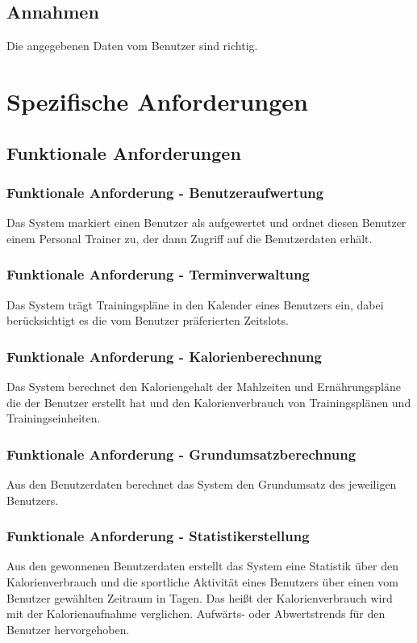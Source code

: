 \documentclass[12pt,a4paper,onecolumn]{article}
\begin{document}
\subsection{Annahmen}
Die angegebenen Daten vom Benutzer sind richtig.

\section{Spezifische Anforderungen}
\subsection{Funktionale Anforderungen}
\subsubsection{Funktionale Anforderung - Benutzeraufwertung}
Das System markiert einen Benutzer als aufgewertet und ordnet diesen Benutzer einem Personal Trainer zu, der dann Zugriff auf die Benutzerdaten erhält.
\subsubsection{Funktionale Anforderung - Terminverwaltung}
Das System trägt Trainingspläne in den Kalender eines Benutzers ein, dabei berücksichtigt es die vom Benutzer präferierten Zeitslots.
\subsubsection{Funktionale Anforderung - Kalorienberechnung}
Das System berechnet den Kaloriengehalt der \gls{Mahlzeit}en und Ernährungspläne die der Benutzer erstellt hat und den Kalorienverbrauch von Trainingsplänen und Trainingseinheiten.
\subsubsection{Funktionale Anforderung - Grundumsatzberechnung}
Aus den Benutzerdaten berechnet das System den Grundumsatz des jeweiligen Benutzers.
\subsubsection{Funktionale Anforderung - Statistikerstellung}
Aus den gewonnenen Benutzerdaten erstellt das System eine Statistik über den Kalorienverbrauch und die sportliche Aktivität eines Benutzers über einen vom Benutzer gewählten Zeitraum in Tagen. Das heißt der Kalorienverbrauch wird mit der Kalorienaufnahme verglichen. Aufwärts- oder Abwertstrends für den Benutzer hervorgehoben.
\end{document}
